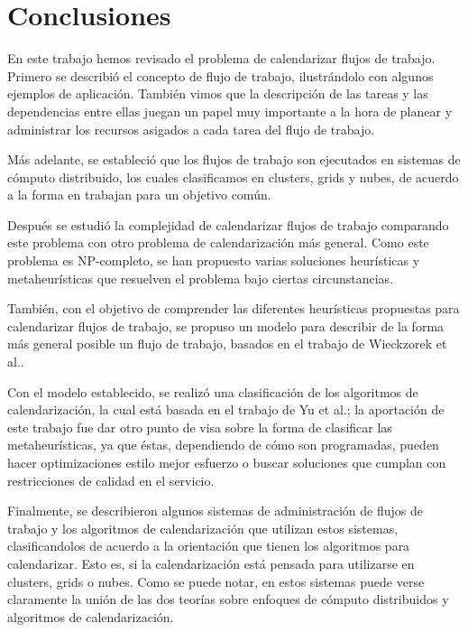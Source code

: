 \chapter{Conclusiones}


En este trabajo hemos revisado el problema de calendarizar flujos de trabajo. Primero se describió el concepto de flujo de trabajo, ilustrándolo con algunos ejemplos de aplicación. También vimos que la descripción de las tareas y las dependencias entre ellas juegan un papel muy importante a la hora de planear y administrar los recursos asigados a cada tarea del flujo de trabajo.

Más adelante, se estableció que los flujos de trabajo son ejecutados en sistemas de cómputo distribuido, los cuales clasificamos en clusters, grids y nubes, de acuerdo a la forma en trabajan para un objetivo común.

Después se estudió la complejidad de calendarizar flujos de trabajo comparando este problema con otro problema de calendarización más general. Como este problema es NP-completo, se han propuesto varias soluciones heurísticas y metaheurísticas que resuelven el problema bajo ciertas circunstancias.

También, con el objetivo de comprender las diferentes heurísticas propuestas para calendarizar flujos de trabajo, se propuso un modelo para describir de la forma más general posible un flujo de trabajo, basados en el trabajo de Wieckzorek et al..

Con el modelo establecido, se realizó una clasificación de los algoritmos de calendarización, la cual está basada en el trabajo de Yu et al.; la aportación de este trabajo fue dar otro punto de visa sobre la forma de clasificar las metaheurísticas, ya que éstas, dependiendo de cómo son programadas, pueden hacer optimizaciones estilo mejor esfuerzo o buscar soluciones que cumplan con restricciones de calidad en el servicio.

Finalmente, se describieron algunos sistemas de administración de flujos de trabajo y los algoritmos de calendarización que utilizan estos sistemas, clasificandolos de acuerdo a la orientación que tienen los algoritmos para calendarizar. Esto es, si la calendarización está pensada para utilizarse en clusters, grids o nubes. Como se puede notar, en estos sistemas puede verse claramente la unión de las dos teorías sobre enfoques de cómputo distribuidos y algoritmos de calendarización.

